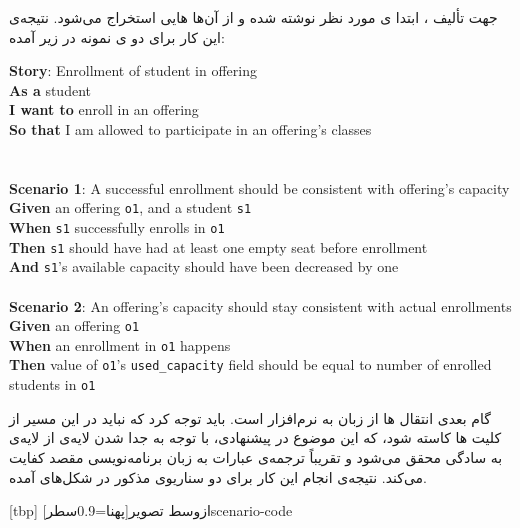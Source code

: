 جهت تألیف ، ابتدا ی مورد نظر نوشته شده و از آن‌ها ‌هایی استخراج می‌شود. نتیجه‌ی این کار برای دو ی نمونه در زیر آمده:

\begin{minipage}{\textwidth}
\latin
\textbf{Story}: Enrollment of student in offering\\
\textbf{As a} student\\
\textbf{I want to} enroll in an offering\\
\textbf{So that} I am allowed to participate in an offering's classes\\
\\
\\
\textbf{Scenario 1}: A successful enrollment should be consistent with offering's capacity
\textbf{Given}
	an offering \texttt{o1}, and a student \texttt{s1}\\
\textbf{When}
	\texttt{s1} successfully enrolls in \texttt{o1}\\
\textbf{Then}
	\texttt{s1} should have had at least one empty seat before enrollment\\
\textbf{And}
	\texttt{s1}'s available capacity should have been decreased by one\\
\\
\textbf{Scenario 2}: An offering's capacity should stay consistent with actual enrollments 
\textbf{Given}
	an offering \texttt{o1}\\
\textbf{When}
	an enrollment in \texttt{o1} happens\\
\textbf{Then}
	value of \texttt{o1}'s \texttt{used\_capacity} field should be equal to number of enrolled students in \texttt{o1}\\
\end{minipage}

گام بعدی انتقال ‌ها از زبان  به نرم‌افزار است. باید توجه کرد که نباید در این مسیر از کلیت ‌ها کاسته شود، که این موضوع در  پیشنهادی، با توجه به جدا شدن لایه‌ی  از لایه‌ی  به سادگی محقق می‌شود و تقریباً ترجمه‌ی عبارات به زبان برنامه‌نویسی مقصد کفایت می‌کند. نتیجه‌ی انجام این کار برای دو سناریوی مذکور در شکل‌های  آمده.

[tbp]
‌ازوسط
‌تصویر[پهنا=0.9‌سطر]{scenario-code}


